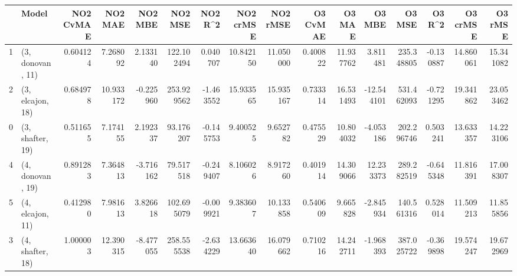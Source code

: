 \begin{tabular}{llrrrrrrrrrrrrrr}
\toprule
{} &             Model &  NO2 CvMAE &    NO2 MAE &   NO2 MBE &     NO2 MSE &   NO2 R\textasciicircum2 &  NO2 crMSE &   NO2 rMSE &  O3 CvMAE &     O3 MAE &     O3 MBE &      O3 MSE &    O3 R\textasciicircum2 &   O3 crMSE &    O3 rMSE \\
\midrule
1 &  (3, donovan, 11) &   0.604124 &   7.268092 &  2.133140 &  122.102494 &  0.040707 &  10.842150 &  11.050000 &  0.400822 &  11.937762 &   3.811481 &  235.348805 & -0.130887 &  14.860061 &  15.341082 \\
2 &  (3, elcajon, 18) &   0.684978 &  10.933172 & -0.225960 &  253.929562 & -1.463552 &  15.933565 &  15.935167 &  0.733314 &  16.531493 & -12.544101 &  531.462093 & -0.721295 &  19.341862 &  23.053462 \\
0 &  (3, shafter, 19) &   0.511655 &   7.174155 &  2.192337 &   93.176207 & -0.145753 &   9.400525 &   9.652782 &  0.475529 &  10.804032 &  -4.053186 &  202.296746 &  0.503241 &  13.633357 &  14.223106 \\
4 &  (4, donovan, 19) &   0.891283 &   7.364813 & -3.716162 &   79.517518 & -0.249407 &   8.106026 &   8.917260 &  0.401914 &  14.309066 &  12.233373 &  289.282519 & -0.645348 &  11.816391 &  17.008307 \\
5 &  (4, elcajon, 11) &   0.412980 &   7.981613 &  3.826618 &  102.695079 & -0.009921 &   9.383607 &  10.133858 &  0.540609 &   9.665828 &  -2.845934 &  140.561316 &  0.528014 &  11.509213 &  11.855856 \\
3 &  (4, shafter, 18) &   1.000003 &  12.390315 & -8.477055 &  258.555538 & -2.634229 &  13.663640 &  16.079662 &  0.710216 &  14.242711 &  -1.968393 &  387.025722 & -0.369898 &  19.574247 &  19.672969 \\
\bottomrule
\end{tabular}
